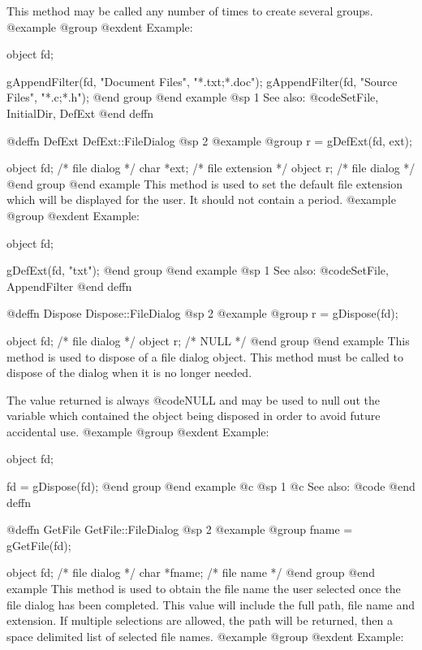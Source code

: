 This method may be called any number of times to create several groups.
@example
@group
@exdent Example:

object  fd;

gAppendFilter(fd, "Document Files", "*.txt;*.doc");
gAppendFilter(fd, "Source Files", "*.c;*.h");
@end group
@end example
@sp 1
See also:  @code{SetFile, InitialDir, DefExt}
@end deffn














@deffn {DefExt} DefExt::FileDialog
@sp 2
@example
@group
r = gDefExt(fd, ext);

object  fd;     /*  file dialog     */
char    *ext;   /*  file extension  */
object  r;      /*  file dialog     */
@end group
@end example
This method is used to set the default file extension which will be
displayed for the user.  It should not contain a period.
@example
@group
@exdent Example:

object  fd;

gDefExt(fd, "txt");
@end group
@end example
@sp 1
See also:  @code{SetFile, AppendFilter}
@end deffn






@deffn {Dispose} Dispose::FileDialog
@sp 2
@example
@group
r = gDispose(fd);

object  fd;   /*  file dialog  */
object  r;    /*  NULL         */
@end group
@end example
This method is used to dispose of a file dialog object.  This method must
be called to dispose of the dialog when it is no longer needed.

The value returned is always @code{NULL} and may be used to null out
the variable which contained the object being disposed in order to
avoid future accidental use.
@example
@group
@exdent Example:

object  fd;

fd = gDispose(fd);
@end group
@end example
@c @sp 1
@c See also:  @code{}
@end deffn











@deffn {GetFile} GetFile::FileDialog
@sp 2
@example
@group
fname = gGetFile(fd);

object  fd;     /*  file dialog  */
char    *fname; /*  file name    */
@end group
@end example
This method is used to obtain the file name the user selected once the
file dialog has been completed.  This value will include the full path,
file name and extension.  If multiple selections are allowed, the path
will be returned, then a space delimited list of selected file names.
@example
@group
@exdent Example:

